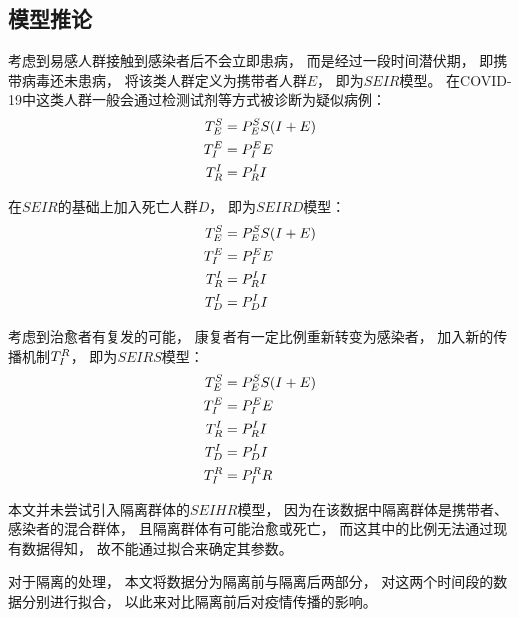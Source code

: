 \subsection{模型推论}
\par 考虑到易感人群接触到感染者后不会立即患病，
而是经过一段时间潜伏期，
即携带病毒还未患病，
将该类人群定义为携带者人群$E$，
即为$SEIR$模型。
在COVID-19中这类人群一般会通过检测试剂等方式被诊断为疑似病例：
\begin{align}
    T^{S}_{E}&=P^{S}_{E}S(I+E) \\
    T^{E}_{I}&=P^{E}_{I}E      \\
    T^{I}_{R}&=P^{I}_{R}I
\end{align}
\par 在$SEIR$的基础上加入死亡人群$D$，
即为$SEIRD$模型：
\begin{align}
    T^{S}_{E}&=P^{S}_{E}S(I+E) \\
    T^{E}_{I}&=P^{E}_{I}E      \\
    T^{I}_{R}&=P^{I}_{R}I      \\
    T^{I}_{D}&=P^{I}_{D}I
\end{align}
\par 考虑到治愈者有复发的可能，
康复者有一定比例重新转变为感染者，
加入新的传播机制$T^{R}_{I}$，
即为$SEIRS$模型：
\begin{align}
    T^{S}_{E}&=P^{S}_{E}S(I+E) \\
    T^{E}_{I}&=P^{E}_{I}E      \\
    T^{I}_{R}&=P^{I}_{R}I      \\
    T^{I}_{D}&=P^{I}_{D}I      \\
    T^{R}_{I}&=P^{R}_{I}R
\end{align}
\par 本文并未尝试引入隔离群体的$SEIHR$模型，
因为在该数据中隔离群体是携带者、感染者的混合群体，
且隔离群体有可能治愈或死亡，
而这其中的比例无法通过现有数据得知，
故不能通过拟合来确定其参数。
\par 对于隔离的处理，
本文将数据分为隔离前与隔离后两部分，
对这两个时间段的数据分别进行拟合，
以此来对比隔离前后对疫情传播的影响。
